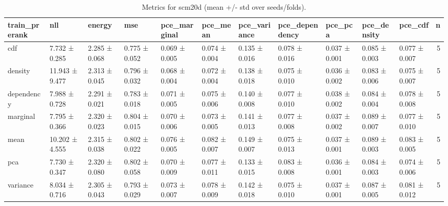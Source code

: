 \begin{table}
\caption{Metrics for scm20d (mean +/- std over seeds/folds).}
\label{tab:metrics_summary_scm20d}
\begin{tabular}{lllllllllllr}
\toprule
train_prerank & nll & energy & mse & pce_marginal & pce_mean & pce_variance & pce_dependency & pce_pca & pce_density & pce_cdf & n \\
\midrule
cdf & 7.732 ± 0.285 & 2.285 ± 0.068 & 0.775 ± 0.052 & 0.069 ± 0.005 & 0.074 ± 0.004 & 0.135 ± 0.016 & 0.078 ± 0.016 & 0.037 ± 0.001 & 0.085 ± 0.003 & 0.077 ± 0.007 & 5 \\
density & 11.943 ± 9.477 & 2.313 ± 0.045 & 0.796 ± 0.032 & 0.068 ± 0.004 & 0.072 ± 0.004 & 0.138 ± 0.018 & 0.075 ± 0.010 & 0.036 ± 0.002 & 0.083 ± 0.006 & 0.075 ± 0.007 & 5 \\
dependency & 7.988 ± 0.728 & 2.291 ± 0.021 & 0.783 ± 0.018 & 0.071 ± 0.005 & 0.075 ± 0.006 & 0.140 ± 0.008 & 0.077 ± 0.010 & 0.038 ± 0.002 & 0.084 ± 0.004 & 0.078 ± 0.008 & 5 \\
marginal & 7.795 ± 0.366 & 2.320 ± 0.023 & 0.804 ± 0.015 & 0.070 ± 0.006 & 0.073 ± 0.005 & 0.141 ± 0.013 & 0.077 ± 0.008 & 0.037 ± 0.002 & 0.089 ± 0.007 & 0.077 ± 0.010 & 5 \\
mean & 10.202 ± 4.555 & 2.315 ± 0.038 & 0.802 ± 0.022 & 0.076 ± 0.005 & 0.082 ± 0.007 & 0.149 ± 0.007 & 0.075 ± 0.013 & 0.037 ± 0.001 & 0.089 ± 0.003 & 0.083 ± 0.005 & 5 \\
pca & 7.730 ± 0.347 & 2.320 ± 0.080 & 0.802 ± 0.058 & 0.070 ± 0.009 & 0.077 ± 0.011 & 0.133 ± 0.015 & 0.083 ± 0.008 & 0.036 ± 0.001 & 0.084 ± 0.003 & 0.074 ± 0.006 & 5 \\
variance & 8.034 ± 0.716 & 2.305 ± 0.043 & 0.793 ± 0.029 & 0.073 ± 0.007 & 0.078 ± 0.009 & 0.142 ± 0.018 & 0.075 ± 0.010 & 0.037 ± 0.001 & 0.087 ± 0.005 & 0.081 ± 0.012 & 5 \\
\bottomrule
\end{tabular}
\end{table}
